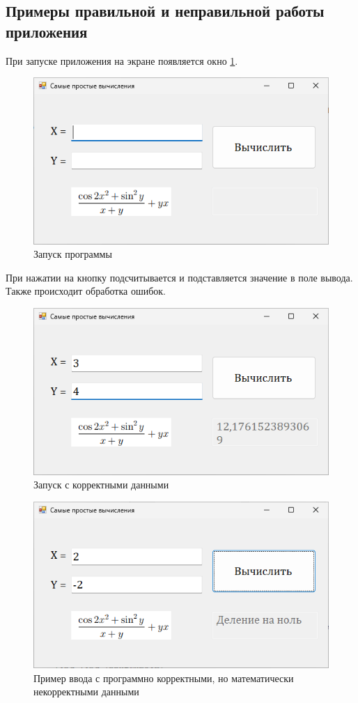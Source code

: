 \subsection{Примеры правильной и неправильной работы приложения}
При запуске приложения на экране появляется окно \ref{fig:simple-calculations-start}.

\begin{figure}
\centering
\includegraphics[width=0.5\linewidth]{images//simple-calculations/start.png}
\caption{Запуск программы}
\label{fig:simple-calculations-start}
\end{figure}

При нажатии на кнопку подсчитывается и подставляется значение в поле вывода. Также происходит обработка ошибок.

\begin{figure}
\centering
\includegraphics[width=0.5\linewidth]{images//simple-calculations/okay.png}
\caption{Запуск с корректными данными}
\label{fig:simple-calculations-okay}
\end{figure}

\begin{figure}
\centering
\includegraphics[width=0.5\linewidth]{images//simple-calculations/error.png}
\caption{Пример ввода с программно корректными, но математически некорректными данными}
\label{fig:simple-calculations-error}
\end{figure}


